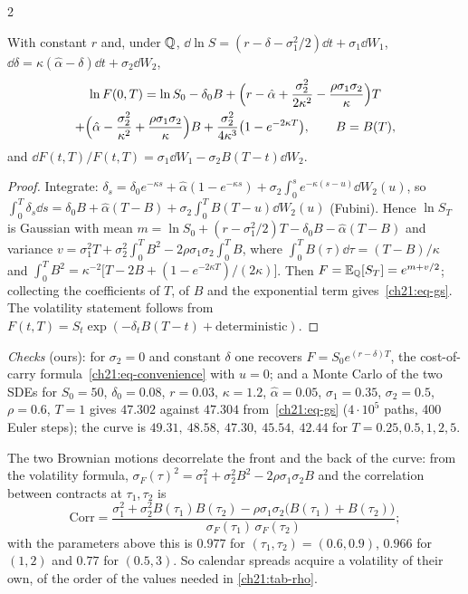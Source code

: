 \begin{paracol}{2}
\begin{proposition}\label{ch21:prop-gs}
With constant $r$ and, under $\mathbb{Q}$, $\dd\ln S=(r-\delta-\sigma_1^2/2)\dd t+\sigma_1\dd W_1$, $\dd\delta=\kappa(\hat\alpha-\delta)\dd t+\sigma_2\dd W_2$,
\begin{equation}\label{ch21:eq-gs}
\begin{gathered}
  \ln F(0,T)=\ln S_0-\delta_0B+\Bigl(r-\hat\alpha+\frac{\sigma_2^2}{2\kappa^2}-\frac{\rho\sigma_1\sigma_2}{\kappa}\Bigr)T\\
  +\Bigl(\hat\alpha-\frac{\sigma_2^2}{\kappa^2}+\frac{\rho\sigma_1\sigma_2}{\kappa}\Bigr)B+\frac{\sigma_2^2}{4\kappa^3}\bigl(1-e^{-2\kappa T}\bigr),\qquad B=B(T),
\end{gathered}
\end{equation}
and $\dd F(t,T)/F(t,T)=\sigma_1\dd W_1-\sigma_2B(T-t)\dd W_2$.
\end{proposition}
\begin{proof}
Integrate: $\delta_s=\delta_0e^{-\kappa s}+\hat\alpha(1-e^{-\kappa s})+\sigma_2\int_0^se^{-\kappa(s-u)}\dd W_2(u)$, so $\int_0^T\delta_s\dd s=\delta_0B+\hat\alpha(T-B)+\sigma_2\int_0^TB(T-u)\dd W_2(u)$ (Fubini). Hence $\ln S_T$ is Gaussian with mean $m=\ln S_0+(r-\sigma_1^2/2)T-\delta_0B-\hat\alpha(T-B)$ and variance
$v=\sigma_1^2T+\sigma_2^2\int_0^TB^2-2\rho\sigma_1\sigma_2\int_0^TB$, where $\int_0^TB(\tau)\dd\tau=(T-B)/\kappa$ and $\int_0^TB^2=\kappa^{-2}\bigl[T-2B+(1-e^{-2\kappa T})/(2\kappa)\bigr]$. Then $F=\mathbb{E}_{\mathbb{Q}}[S_T]=e^{m+v/2}$; collecting the coefficients of $T$, of $B$ and the exponential term gives~\eqref{ch21:eq-gs}. The
volatility statement follows from $F(t,T)=S_t\exp(-\delta_tB(T-t)+\text{deterministic})$.
\end{proof}
\emph{Checks} (ours): for $\sigma_2=0$ and constant $\delta$ one recovers $F=S_0e^{(r-\delta)T}$, the cost-of-carry formula~\eqref{ch21:eq-convenience} with $u=0$; and a Monte Carlo of the two SDEs for $S_0=50$, $\delta_0=0.08$, $r=0.03$, $\kappa=1.2$, $\hat\alpha=0.05$, $\sigma_1=0.35$, $\sigma_2=0.5$, $\rho=0.6$, $T=1$ gives $47.302$ against $47.304$ from~\eqref{ch21:eq-gs}
($4\cdot10^5$ paths, 400 Euler steps); the curve is $49.31,\ 48.58,\ 47.30,\ 45.54,\ 42.44$ for $T=0.25,0.5,1,2,5$.

The two Brownian motions decorrelate the front and the back of the curve: from the volatility formula, $\sigma_F(\tau)^2=\sigma_1^2+\sigma_2^2B^2-2\rho\sigma_1\sigma_2B$ and the correlation between contracts at $\tau_1,\tau_2$ is
\[
  \mathrm{Corr}=\frac{\sigma_1^2+\sigma_2^2B(\tau_1)B(\tau_2)-\rho\sigma_1\sigma_2\bigl(B(\tau_1)+B(\tau_2)\bigr)}{\sigma_F(\tau_1)\,\sigma_F(\tau_2)};
\]
with the parameters above this is $0.977$ for $(\tau_1,\tau_2)=(0.6,0.9)$, $0.966$ for $(1,2)$ and $0.77$ for $(0.5,3)$. So calendar spreads acquire a volatility of their own, of the order of the values needed in \cref{ch21:tab-rho}.


\end{paracol}
